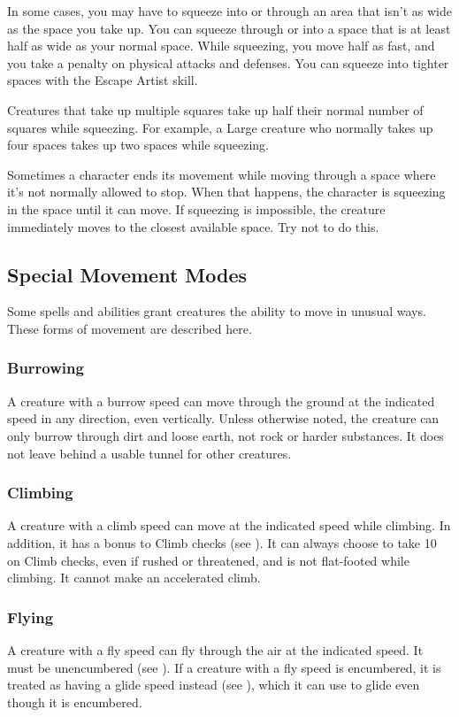 In some cases, you may have to squeeze into or through an area that isn't as wide as the space you take up. You can squeeze through or into a space that is at least half as wide as your normal space. While squeezing, you move half as fast, and you take a  penalty on physical attacks and defenses. You can squeeze into tighter spaces with the Escape Artist skill.

Creatures that take up multiple squares take up half their normal number of squares while squeezing. For example, a Large creature who normally takes up four spaces takes up two spaces while squeezing.

 Sometimes a character ends its movement while moving through a space where it's not normally allowed to stop. When that happens, the character is squeezing in the space until it can move. If squeezing is impossible, the creature immediately moves to the closest available space. Try not to do this.

\subsection{Special Movement Modes}\label{Special Movement Modes}
Some spells and abilities grant creatures the ability to move in unusual ways. These forms of movement are described here.

\subsubsection{Burrowing}\label{Burrowing}
A creature with a burrow speed can move through the ground at the indicated speed in any direction, even vertically. Unless otherwise noted, the creature can only burrow through dirt and loose earth, not rock or harder substances. It does not leave behind a usable tunnel for other creatures. 

\subsubsection{Climbing}\label{Climbing}
A creature with a climb speed can move at the indicated speed while climbing. In addition, it has a  bonus to Climb checks (see ). It can always choose to take 10 on Climb checks, even if rushed or threatened, and is not flat-footed while climbing. It cannot make an accelerated climb. 

\subsubsection{Flying}\label{Flying}
A creature with a fly speed can fly through the air at the indicated speed. It must be unencumbered (see ). If a creature with a fly speed is encumbered, it is treated as having a glide speed instead (see ), which it can use to glide even though it is encumbered.

